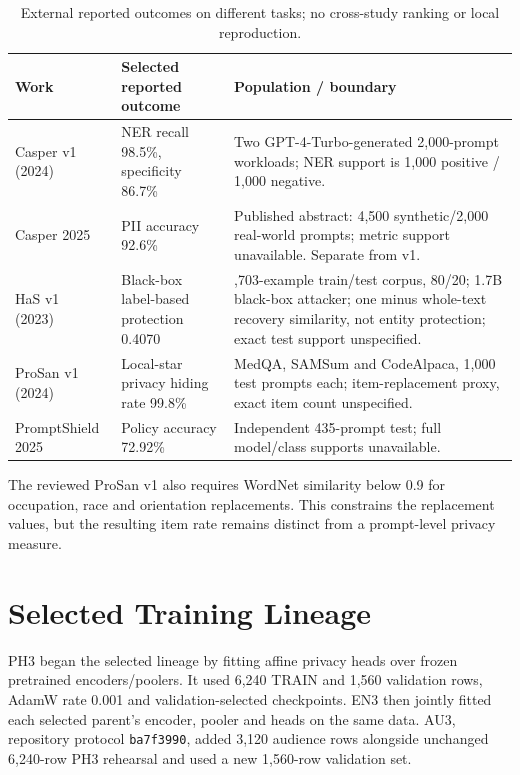 \documentclass[conference]{IEEEtran}
\begin{document}
\begin{table}[t]
\centering
\caption{External reported outcomes on different tasks; no cross-study ranking or local reproduction.}
\label{tab:related_results}
\small
\begin{tabular}{>{\raggedright\arraybackslash}p{}>{\raggedright\arraybackslash}p{}>{\raggedright\arraybackslash}p{}}
\toprule
Work & Selected reported outcome & Population / boundary \\
\midrule
Casper v1 (2024)~\cite{CasperPreprintV12024} & NER recall 98.5\%, specificity 86.7\% & Two GPT-4-Turbo-generated 2,000-prompt workloads; NER support is 1,000 positive / 1,000 negative. \\
Casper 2025~\cite{CasperAbstract2026} & PII accuracy 92.6\% & Published abstract: 4,500 synthetic/2,000 real-world prompts; metric support unavailable. Separate from v1. \\
HaS v1 (2023)~\cite{HaS2024} & Black-box label-based protection 0.4070 & 19,703-example train/test corpus, 80/20; 1.7B black-box attacker; one minus whole-text recovery similarity, not entity protection; exact test support unspecified. \\
ProSan v1 (2024)~\cite{ProSan2024} & Local-star privacy hiding rate 99.8\% & MedQA, SAMSum and CodeAlpaca, 1,000 test prompts each; item-replacement proxy, exact item count unspecified. \\
PromptShield 2025~\cite{PromptShieldAbstract2026} & Policy accuracy 72.92\% & Independent 435-prompt test; full model/class supports unavailable. \\
\bottomrule
\end{tabular}
\end{table}
The reviewed ProSan v1 also requires WordNet similarity below 0.9 for occupation, race and orientation replacements. This constrains the replacement values, but the resulting item rate remains distinct from a prompt-level privacy measure.

\section{Selected Training Lineage}
\label{app:lineage}
PH3 began the selected lineage by fitting affine privacy heads over frozen pretrained encoders/poolers. It used 6,240 TRAIN and 1,560 validation rows, AdamW rate 0.001 and validation-selected checkpoints. EN3 then jointly fitted each selected parent's encoder, pooler and heads on the same data. AU3, repository protocol \texttt{ba7f3990}, added 3,120 audience rows alongside unchanged 6,240-row PH3 rehearsal and used a new 1,560-row validation set.
\end{document}
